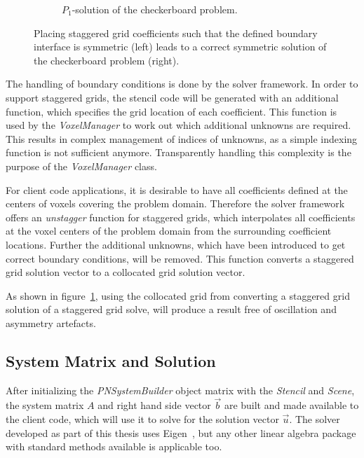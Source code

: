 \begin{figure}[h]
\begin{subfigure}[t]{0.34\columnwidth}
\caption{$P_1$-solution of the checkerboard problem.}
\label{fig:pn_staggering_correct_bc_checkerboard}
\end{subfigure}%
\caption{Placing staggered grid coefficients such that the defined boundary interface is symmetric (left) leads to a correct symmetric solution of the checkerboard problem (right).}
\label{fig:pn_staggered_grid_handled_bc}
\end{figure}

The handling of boundary conditions is done by the solver framework. In order to support staggered grids, the stencil code will be generated with an additional function, which specifies the grid location of each coefficient. This function is used by the \emph{VoxelManager} to work out which additional unknowns are required. This results in complex management of indices of unknowns, as a simple indexing function is not sufficient anymore. Transparently handling this complexity is the purpose of the \emph{VoxelManager} class.

For client code applications, it is desirable to have all coefficients defined at the centers of voxels covering the problem domain. Therefore the solver framework offers an \emph{unstagger} function for staggered grids, which interpolates all coefficients at the voxel centers of the problem domain from the surrounding coefficient locations. Further the additional unknowns, which have been introduced to get correct boundary conditions, will be removed. This function converts a staggered grid solution vector to a collocated grid solution vector.

As shown in figure~\ref{fig:pn_staggering_correct_bc_checkerboard}, using the collocated grid from converting a staggered grid solution of a staggered grid solve, will produce a result free of oscillation and asymmetry artefacts.

\subsection{System Matrix and Solution}
\label{sec:pn_system_matrix}

After initializing the \emph{PNSystemBuilder} object matrix with the \emph{Stencil} and \emph{Scene}, the system matrix $A$ and right hand side vector $\vec{b}$ are built and made available to the client code, which will use it to solve for the solution vector $\vec{u}$. The solver developed as part of this thesis uses Eigen~\cite{Eigen}, but any other linear algebra package with standard methods available is applicable too. 

